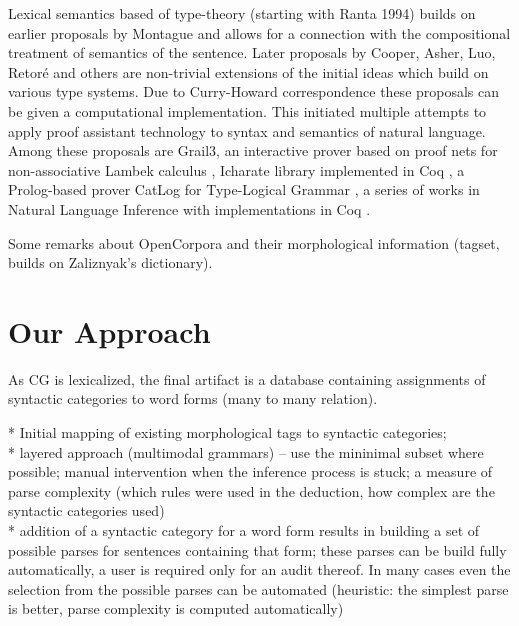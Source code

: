 \documentclass[a4paper]{article}
\theoremstyle{example-style}
\begin{document}
Lexical semantics based of type-theory (starting with Ranta 1994) builds on earlier proposals by Montague and allows for a connection with the compositional treatment of semantics of the sentence. Later proposals by Cooper, Asher, Luo, Retor\'{e} and others are non-trivial extensions of the initial ideas which build on various type systems. Due to Curry-Howard correspondence these proposals can be given a computational implementation. This initiated multiple attempts to apply proof assistant technology to syntax and semantics of natural language. Among these proposals are Grail3, an interactive prover based on proof nets for non-associative Lambek calculus \parencite{moot2002proof}, Icharate library implemented in Coq \parencite{anoun2007approche}, a Prolog-based prover CatLog for Type-Logical Grammar \parencite{morrill2012catlog}, a series of works in Natural Language Inference with implementations in Coq \parencite{chatzikyriakidis2014natural}.
 
Some remarks about OpenCorpora and their morphological information (tagset, builds on Zaliznyak's dictionary).


\section{Our Approach}

As CG is lexicalized, the final artifact is a database containing assignments of syntactic categories to word forms (many to many relation).

  * Initial mapping of existing morphological tags to syntactic categories; \\
  
  * layered approach (multimodal grammars) -- use the mininimal subset where possible; manual intervention when 
    the inference process is stuck; a measure of parse complexity (which rules were used in the deduction, how complex are the syntactic categories used) \\
    
  * addition of a syntactic category for a word form results in building a set of possible parses for sentences containing that form; these parses can be build fully automatically, a user is required only for an audit thereof. In many cases even the selection from the possible parses can be automated (heuristic: the simplest parse is better, parse complexity is computed automatically) \\
  
\end{document}
